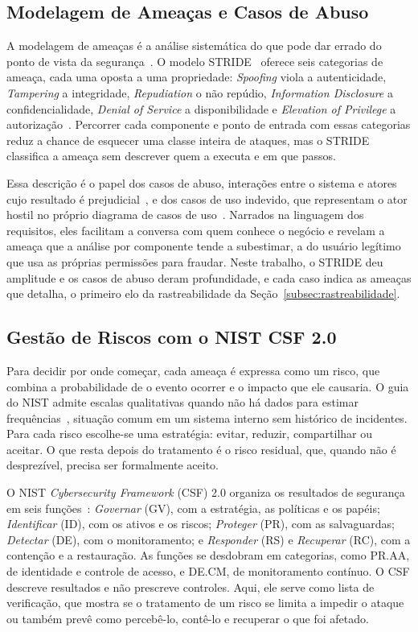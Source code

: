 \documentclass[conference]{IEEEtran}
\begin{document}
\subsection{Modelagem de Ameaças e Casos de Abuso}

A modelagem de ameaças é a análise sistemática do que pode dar errado do ponto de vista da segurança~\cite{shostack2014}. O modelo STRIDE~\cite{kohnfelder1999} oferece seis categorias de ameaça, cada uma oposta a uma propriedade: \textit{Spoofing} viola a autenticidade, \textit{Tampering} a integridade, \textit{Repudiation} o não repúdio, \textit{Information Disclosure} a confidencialidade, \textit{Denial of Service} a disponibilidade e \textit{Elevation of Privilege} a autorização~\cite{shostack2014}. Percorrer cada componente e ponto de entrada com essas categorias reduz a chance de esquecer uma classe inteira de ataques, mas o STRIDE classifica a ameaça sem descrever quem a executa e em que passos.

Essa descrição é o papel dos casos de abuso, interações entre o sistema e atores cujo resultado é prejudicial~\cite{mcdermott1999}, e dos casos de uso indevido, que representam o ator hostil no próprio diagrama de casos de uso~\cite{sindre2005}. Narrados na linguagem dos requisitos, eles facilitam a conversa com quem conhece o negócio e revelam a ameaça que a análise por componente tende a subestimar, a do usuário legítimo que usa as próprias permissões para fraudar. Neste trabalho, o STRIDE deu amplitude e os casos de abuso deram profundidade, e cada caso indica as ameaças que detalha, o primeiro elo da rastreabilidade da Seção~\ref{subsec:rastreabilidade}.

\subsection{Gestão de Riscos com o NIST CSF 2.0}

Para decidir por onde começar, cada ameaça é expressa como um risco, que combina a probabilidade de o evento ocorrer e o impacto que ele causaria. O guia do NIST admite escalas qualitativas quando não há dados para estimar frequências~\cite{nist2012risk}, situação comum em um sistema interno sem histórico de incidentes. Para cada risco escolhe-se uma estratégia: evitar, reduzir, compartilhar ou aceitar. O que resta depois do tratamento é o risco residual, que, quando não é desprezível, precisa ser formalmente aceito.

O NIST \textit{Cybersecurity Framework} (CSF) 2.0 organiza os resultados de segurança em seis funções~\cite{nist2024csf}: \emph{Governar} (GV), com a estratégia, as políticas e os papéis; \emph{Identificar} (ID), com os ativos e os riscos; \emph{Proteger} (PR), com as salvaguardas; \emph{Detectar} (DE), com o monitoramento; e \emph{Responder} (RS) e \emph{Recuperar} (RC), com a contenção e a restauração. As funções se desdobram em categorias, como PR.AA, de identidade e controle de acesso, e DE.CM, de monitoramento contínuo. O CSF descreve resultados e não prescreve controles. Aqui, ele serve como lista de verificação, que mostra se o tratamento de um risco se limita a impedir o ataque ou também prevê como percebê-lo, contê-lo e recuperar o que foi afetado.
\end{document}
